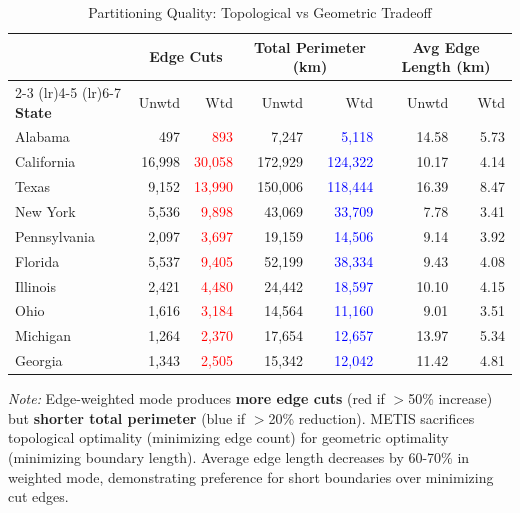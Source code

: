 \begin{table}[t]
\caption{Partitioning Quality: Topological vs Geometric Tradeoff}
\label{tab:partition-quality}
\centering
\small
\begin{tabular}{@{}lrrrrrr@{}}
\toprule
& \multicolumn{2}{c}{\textbf{Edge Cuts}} & \multicolumn{2}{c}{\textbf{Total Perimeter (km)}} & \multicolumn{2}{c}{\textbf{Avg Edge Length (km)}} \\
\cmidrule(lr){2-3} \cmidrule(lr){4-5} \cmidrule(lr){6-7}
\textbf{State} & Unwtd & Wtd & Unwtd & Wtd & Unwtd & Wtd \\
\midrule
Alabama & 497 & \textcolor{red}{893} & 7,247 & \textcolor{blue}{5,118} & 14.58 & 5.73 \\
California & 16,998 & \textcolor{red}{30,058} & 172,929 & \textcolor{blue}{124,322} & 10.17 & 4.14 \\
Texas & 9,152 & \textcolor{red}{13,990} & 150,006 & \textcolor{blue}{118,444} & 16.39 & 8.47 \\
New York & 5,536 & \textcolor{red}{9,898} & 43,069 & \textcolor{blue}{33,709} & 7.78 & 3.41 \\
Pennsylvania & 2,097 & \textcolor{red}{3,697} & 19,159 & \textcolor{blue}{14,506} & 9.14 & 3.92 \\
Florida & 5,537 & \textcolor{red}{9,405} & 52,199 & \textcolor{blue}{38,334} & 9.43 & 4.08 \\
Illinois & 2,421 & \textcolor{red}{4,480} & 24,442 & \textcolor{blue}{18,597} & 10.10 & 4.15 \\
Ohio & 1,616 & \textcolor{red}{3,184} & 14,564 & \textcolor{blue}{11,160} & 9.01 & 3.51 \\
Michigan & 1,264 & \textcolor{red}{2,370} & 17,654 & \textcolor{blue}{12,657} & 13.97 & 5.34 \\
Georgia & 1,343 & \textcolor{red}{2,505} & 15,342 & \textcolor{blue}{12,042} & 11.42 & 4.81 \\
\bottomrule
\end{tabular}
\vspace{0.5em}

\footnotesize
\textit{Note:} Edge-weighted mode produces \textbf{more edge cuts} (red if $>$50\% increase)
but \textbf{shorter total perimeter} (blue if $>$20\% reduction).
METIS sacrifices topological optimality (minimizing edge count) for geometric optimality
(minimizing boundary length). Average edge length decreases by 60-70\% in weighted mode,
demonstrating preference for short boundaries over minimizing cut edges.
\end{table}
